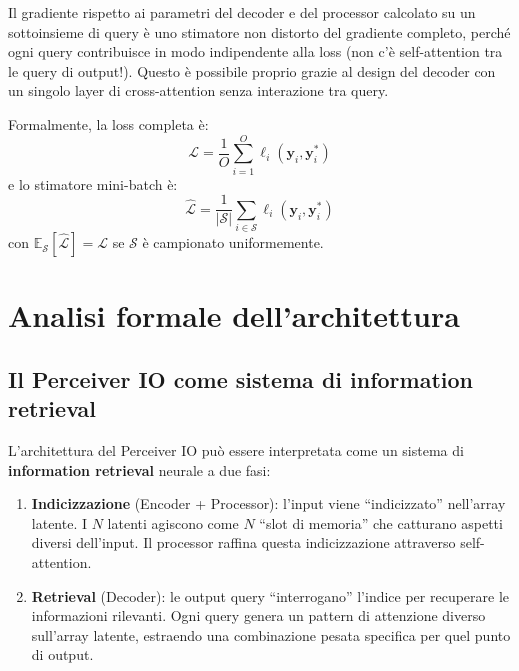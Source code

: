 \documentclass[12pt,a4paper]{article}
\begin{document}
\begin{notabox}
Il gradiente rispetto ai parametri del decoder e del processor calcolato su un sottoinsieme di query \`e uno stimatore non distorto del gradiente completo, perch\'e ogni query contribuisce in modo indipendente alla loss (non c'\`e self-attention tra le query di output!). Questo \`e possibile proprio grazie al design del decoder con un singolo layer di cross-attention senza interazione tra query.

Formalmente, la loss completa \`e:
\[
\mathcal{L} = \frac{1}{O}\sum_{i=1}^{O} \ell_i(\mathbf{y}_i, \mathbf{y}_i^*)
\]
e lo stimatore mini-batch \`e:
\[
\hat{\mathcal{L}} = \frac{1}{|\mathcal{S}|}\sum_{i \in \mathcal{S}} \ell_i(\mathbf{y}_i, \mathbf{y}_i^*)
\]
con $\mathbb{E}_\mathcal{S}[\hat{\mathcal{L}}] = \mathcal{L}$ se $\mathcal{S}$ \`e campionato uniformemente.
\end{notabox}


\section{Analisi formale dell'architettura}

\subsection{Il Perceiver IO come sistema di information retrieval}

L'architettura del Perceiver IO pu\`o essere interpretata come un sistema di \textbf{information retrieval} neurale a due fasi:

\begin{enumerate}
    \item \textbf{Indicizzazione} (Encoder + Processor): l'input viene ``indicizzato'' nell'array latente. I $N$ latenti agiscono come $N$ ``slot di memoria'' che catturano aspetti diversi dell'input. Il processor raffina questa indicizzazione attraverso self-attention.

    \item \textbf{Retrieval} (Decoder): le output query ``interrogano'' l'indice per recuperare le informazioni rilevanti. Ogni query genera un pattern di attenzione diverso sull'array latente, estraendo una combinazione pesata specifica per quel punto di output.
\end{enumerate}
\end{document}
